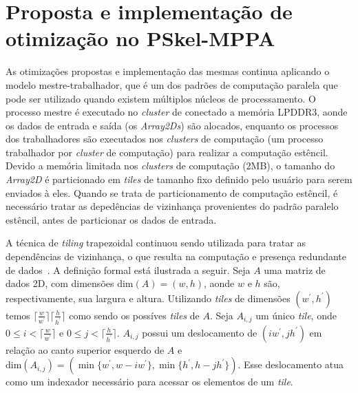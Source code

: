 %

\chapter{Proposta e implementação de otimização no PSkel-MPPA}
\label{cap:pskelMPPA}


As otimizações propostas e implementação das mesmas continua aplicando o modelo mestre-trabalhador, que é um dos padrões de computação paralela que pode ser utilizado quando existem múltiplos núcleos de processamento. O processo mestre é executado no \emph{cluster} de \io conectado a memória LPDDR3, aonde os dados de entrada e saída (os \emph{Array2Ds}) são alocados, enquanto os processos dos trabalhadores são executados nos \emph{clusters} de computação (um processo trabalhador por \emph{cluster} de computação) para realizar a computação estêncil. Devido a memória limitada nos \emph{clusters} de computação (2MB), o tamanho do \emph{Array2D} é particionado em \emph{tiles} de tamanho fixo definido pelo usuário para serem enviados à eles. Quando se trata de particionamento de computação estêncil, é necessário tratar as depedências de vizinhança provenientes do padrão paralelo estêncil, antes de particionar os dados de entrada.

A técnica de \emph{tiling} trapezoidal continuou sendo utilizada para tratar as dependências de vizinhança, o que resulta na computação e presença redundante de dados~\cite{Rocha:2017}. A definição formal está ilustrada a seguir.
Seja $A$ uma matriz de dados 2D, com dimensões $\textrm{dim}(A) = (w, h)$, aonde $w$ e $h$ são, respectivamente, sua largura e altura.
Utilizando \emph{tiles} de dimensões $(w^\prime, h^\prime)$ temos $\lceil\frac{w}{w^\prime}\rceil\lceil\frac{h}{h^\prime}\rceil$ como sendo os possíves \emph{tiles} de $A$.
Seja $A_{i,j}$ um único \emph{tile}, onde $0\leq i < \lceil\frac{w}{ w^\prime}\rceil$ e $0\leq j < \lceil\frac{h}{ h^\prime}\rceil$.
$A_{i,j}$ possui um deslocamento de $(i w^\prime,j h^\prime)$ em relação ao canto superior esquerdo de $A$ e $\textrm{dim}(A_{i,j}) = (\min\{w^\prime, w-i w^\prime\}, \min\{h^\prime, h-j h^\prime\})$.
Esse deslocamento atua como um indexador necessário para acessar os elementos de um \emph{tile}.

